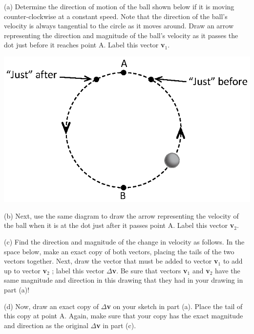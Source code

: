 (a) Determine the direction of motion of the ball shown below if it is moving
counter-clockwise at a constant speed. Note that the direction of the ball's
velocity is always tangential to the circle as it moves around. Draw an arrow
representing the direction and magnitude of the ball's velocity as it passes
the dot just before it reaches point A. Label this vector \textbf{v}\( _{1} \). 

{\par\centering \includegraphics{circ_motion/circ_motion_fig2_new.eps} \par}

(b) Next, use the same diagram to draw the arrow representing the velocity of
the ball when it is at the dot just after it passes point A. Label this vector
\textbf{v}\( _{2} \).

(c) Find the direction and magnitude of the change in velocity as follows. In
the space below, make an exact copy of both vectors, placing the tails of the
two vectors together. Next, draw the vector that must be added to vector \textbf{v}\( _{1} \)
to add up to vector \textbf{v}\( _{2} \) ; label this vector \( \Delta  \)\textbf{v}.
Be sure that vectors \textbf{v}\( _{1} \) and \textbf{v}\( _{2} \) have the
same magnitude and direction in this drawing that they had in your drawing in
part (a)!
\vspace{30mm}

(d) Now, draw an exact copy of \( \Delta  \)\textbf{v} on your sketch in part
(a). Place the tail of this copy at point A. Again, make sure that your copy
has the exact magnitude and direction as the original \( \Delta  \)\textbf{v}
in part (c).
\vspace{20mm}

